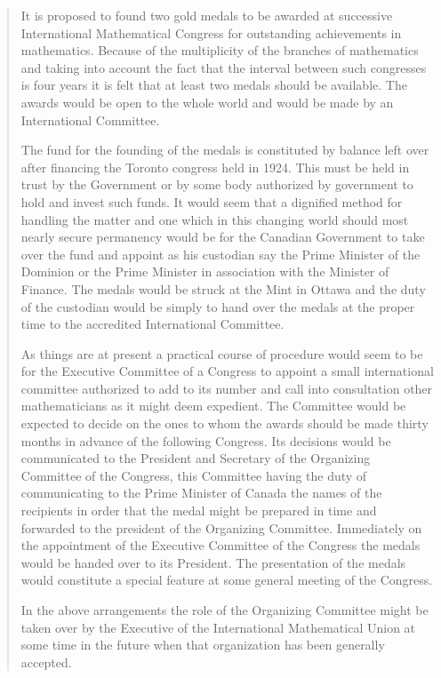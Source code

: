 \begin{quote}
  It is proposed to found two gold medals to be awarded at successive
International Mathematical Congress for outstanding achievements in
mathematics. Because of the multiplicity of the branches of mathematics
and taking into account the fact that the interval between such congresses
is four years it is felt that at least two medals should be available. The
awards would be open to the whole world and would be made by an
International Committee.

  The fund for the founding of the medals  is constituted by balance left
over after financing the Toronto congress held in 1924. This must be held
in trust by the Government or by some body authorized by government to hold
and invest such funds. It would seem that a dignified method for handling
the matter and one which in this changing world should most nearly secure
permanency would be for the Canadian Government to take over the fund and
appoint as his custodian say the Prime Minister of the Dominion or the
Prime Minister in association with the Minister of Finance. The medals
would be struck at the Mint in Ottawa and the duty of the custodian would
be simply to hand over the medals at the proper time to the accredited
International Committee.

  As things are at present a practical course of procedure would seem to be
for the Executive Committee of a Congress to appoint a small international
committee authorized to add to its number and call into consultation other
mathematicians as it might deem expedient. The Committee would be expected
to decide on the ones to whom the awards should be made thirty months in
advance of the following Congress. Its decisions would be communicated to
the President and Secretary of the Organizing Committee of the Congress,
this Committee having the duty of communicating to the Prime Minister of
Canada the names of the recipients in order that the medal might be
prepared in time and forwarded to the president of the Organizing
Committee. Immediately on the appointment of the Executive Committee of the
Congress the medals would be handed over to its President. The presentation
of the medals would constitute a special feature at some general meeting of
the Congress.

  In the above arrangements the role of the Organizing Committee might be
taken over by the Executive of the International Mathematical Union at some
time in the future when that organization has been generally accepted.


\end{quote}
